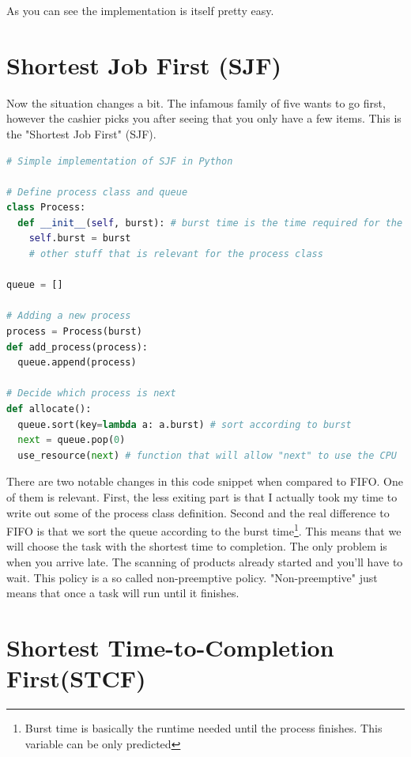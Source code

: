 \documentclass{report}
\newcounter{defi}[section]\setcounter{defi}{0}
\begin{document}
As you can see the implementation is itself pretty easy.
\pagebreak

\section{Shortest Job First (SJF)}

Now the situation changes a bit. 
The infamous family of five wants to go first, however the cashier picks you after seeing that you only have a few items.
This is the "Shortest Job First" (SJF). 

\begin{lstlisting}[language=Python, style=colorEX, label=cd:sjf-python]
# Simple implementation of SJF in Python

# Define process class and queue
class Process:
  def __init__(self, burst): # burst time is the time required for the process to finish
    self.burst = burst
    # other stuff that is relevant for the process class

queue = []

# Adding a new process
process = Process(burst) 
def add_process(process): 
  queue.append(process)

# Decide which process is next
def allocate():
  queue.sort(key=lambda a: a.burst) # sort according to burst
  next = queue.pop(0)
  use_resource(next) # function that will allow "next" to use the CPU
\end{lstlisting}

There are two notable changes in this code snippet when compared to FIFO. One of them is relevant.
First, the less exiting part is that I actually took my time to write out some of the process class definition.
Second and the real difference to FIFO is that we sort the queue according to the burst time\footnote{Burst time is basically the runtime needed until the process finishes. This variable can be only predicted}. 
This means that we will choose the task with the shortest time to completion.
The only problem is when you arrive late. The scanning of products already started and you'll have to wait.
This policy is a so called non-preemptive policy.
"Non-preemptive" just means that once a task will run until it finishes.


\section{Shortest Time-to-Completion First(STCF)}
\end{document}
